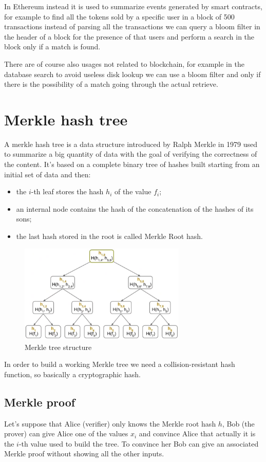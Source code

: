In Ethereum instead it is used to summarize events generated by smart contracts, for example to find all the tokens sold by a specific user in a block of 500 transactions instead of parsing all the transactions we can query a bloom filter in the header of a block for the presence of that users and perform a search in the block only if a match is found.

There are of course also usages not related to blockchain, for example in the database search to avoid useless disk lookup we can use a bloom filter and only if there is the possibility of a match going through the actual retrieve.

\section{Merkle hash tree}
A merkle hash tree is a data structure introduced by Ralph Merkle in 1979 used to summarize a big quantity of data with the goal of verifying the correctness of the content.
It's based on a complete binary tree of hashes built starting from an initial set of data and then:
\begin{itemize}
    \item the $i$-th leaf stores the hash $h_i$ of the value $f_i$;
    \item an internal node contains the hash of the concatenation of the hashes of its sons;
    \item the last hash stored in the root is called Merkle Root hash.
\end{itemize}
\begin{figure}[H]
    \centering
    \includegraphics[width=300px]{images/4_Cryptographic_Toolbox/02.png}
    \caption{Merkle tree structure}
\end{figure}

In order to build a working Merkle tree we need a collision-resistant hash function, so basically a cryptographic hash.

\subsection{Merkle proof}
Let's suppose that Alice (verifier) only knows the Merkle root hash $h$, Bob (the prover) can give Alice one of the values $x_i$ and convince Alice that actually it is the $i$-th value used to build the tree.
To convince her Bob can give an associated Merkle proof without showing all the other inputs.

